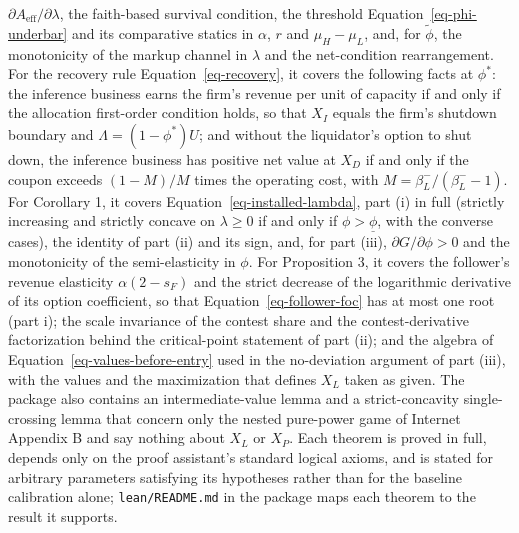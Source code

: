 \documentclass[
  11pt,
  letterpaper,
]{scrartcl}
\begin{document}
\(\partial A_{\text{eff}}/\partial \lambda\), the faith-based survival
condition, the threshold Equation~\ref{eq-phi-underbar} and its
comparative statics in \(\alpha\), \(r\) and \(\mu_H - \mu_L\), and, for
\(\tilde{\phi}\), the monotonicity of the markup channel in \(\lambda\)
and the net-condition rearrangement. For the recovery rule
Equation~\ref{eq-recovery}, it covers the following facts at \(\phi^*\):
the inference business earns the firm's revenue per unit of capacity if
and only if the allocation first-order condition holds, so that \(X_I\)
equals the firm's shutdown boundary and \(\Lambda = (1 - \phi^*)U\); and
without the liquidator's option to shut down, the inference business has
positive net value at \(X_D\) if and only if the coupon exceeds
\((1 - M)/M\) times the operating cost, with
\(M = \beta_L^-/(\beta_L^- - 1)\). For Corollary 1, it covers
Equation~\ref{eq-installed-lambda}, part (i) in full (strictly
increasing and strictly concave on \(\lambda \geq 0\) if and only if
\(\phi > \underline{\phi}\), with the converse cases), the identity of
part (ii) and its sign, and, for part (iii),
\(\partial G/\partial \phi > 0\) and the monotonicity of the
semi-elasticity in \(\phi\). For Proposition 3, it covers the follower's
revenue elasticity \(\alpha(2 - s_F)\) and the strict decrease of the
logarithmic derivative of its option coefficient, so that
Equation~\ref{eq-follower-foc} has at most one root (part i); the scale
invariance of the contest share and the contest-derivative factorization
behind the critical-point statement of part (ii); and the algebra of
Equation~\ref{eq-values-before-entry} used in the no-deviation argument
of part (iii), with the values and the maximization that defines \(X_L\)
taken as given. The package also contains an intermediate-value lemma
and a strict-concavity single-crossing lemma that concern only the
nested pure-power game of Internet Appendix B and say nothing about
\(X_L\) or \(X_P\). Each theorem is proved in full, depends only on the
proof assistant's standard logical axioms, and is stated for arbitrary
parameters satisfying its hypotheses rather than for the baseline
calibration alone; \texttt{lean/README.md} in the package maps each
theorem to the result it supports.
\end{document}
